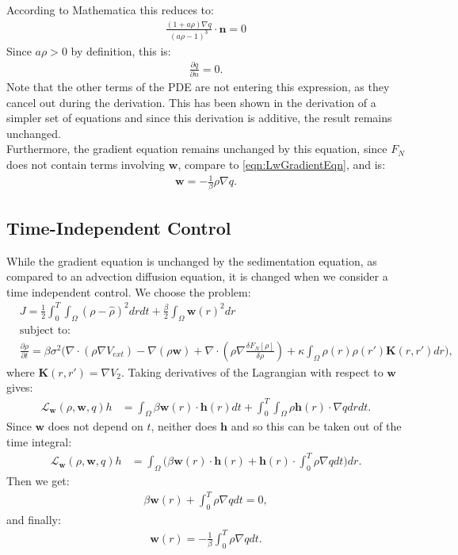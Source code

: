 \documentclass[11pt, a4paper]{article}
\theoremstyle{definition}
\newcommand{\w}{\mathbf{w}}
\newcommand{\n}{\mathbf{n}}
\newcommand{\h}{\mathbf{h}}
\newcommand{\K}{\mathbf{K}}
\begin{document}
According to Mathematica this reduces to:
\begin{align*}
	\frac{(1 + a \rho) \nabla q}{(a \rho -1)^3}\cdot \n = 0
\end{align*}
Since $a \rho >0$ by definition, this is:
\begin{align*}
	\frac{\partial q}{\partial n} = 0.
\end{align*}
Note that the other terms of the PDE are not entering this expression, as they cancel out during the derivation. This has been shown in the derivation of a simpler set of equations and since this derivation is additive, the result remains unchanged.\\
Furthermore, the gradient equation remains unchanged by this equation, since $F_N$ does not contain terms involving $\w$, compare to \eqref{eqn:LwGradientEqn}, and is:
\begin{align*}
	\w = - \frac{1}{\beta}\rho \nabla q.
\end{align*}
\subsection{Time-Independent Control} \label{sec:TimeIndependentControl}
While the gradient equation is unchanged by the sedimentation equation, as compared to an advection diffusion equation, it is changed when we consider a time independent control.
We choose the problem:
\begin{align*}
	&J = \frac{1}{2}\int_0^T \int_\Omega (\rho - \widehat \rho)^2 dr dt + \frac{\beta}{2} \int_\Omega \w(r)^2 dr\\
	&\text{subject to:}\\
	&\frac{\partial \rho}{\partial t} = \beta \sigma^2 \bigg( \nabla \cdot (\rho \nabla V_{ext}) - \nabla (\rho \w) + \nabla \cdot \left(\rho \nabla \frac{\delta F_{N}[\rho]}{\delta \rho}\right) + \kappa \int_\Omega \rho(r) \rho(r') \K(r,r')dr\bigg),
\end{align*}
where $\K(r,r') = \nabla V_2$.
Taking derivatives of the Lagrangian with respect to $\w$ gives:
\begin{align}\label{eqn:LwGradientEqn}
	\mathcal{L}_\w(\rho,\w, q)h &= \int_\Omega \beta \w(r) \cdot \h(r) dt + \int_0^T \int_\Omega \rho \h(r) \cdot \nabla q dr dt.
\end{align}
Since $\w$ does not depend on $t$, neither does $\h$ and so this can be taken out of the time integral:
\begin{align*}
	\mathcal{L}_\w(\rho,\w, q)h &= \int_\Omega \bigg( \beta \w(r) \cdot \h(r)  + \h(r) \cdot \int_0^T \rho  \nabla q dt \bigg) dr.
\end{align*}
Then we get:
\begin{align*}
	\beta \w(r)  +  \int_0^T \rho  \nabla q dt = 0,
\end{align*}
and finally:
\begin{align*}
	\w(r) = - \frac{1}{\beta} \int_0^T \rho  \nabla q dt.
\end{align*}
\end{document}
